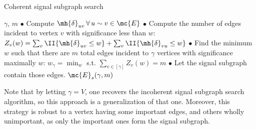 \begin{algorithm}[h!]                      %
\caption{Coherent signal subgraph search}          %
\label{alg:1}                           %
\begin{algorithmic}                    %
\REQUIRE $\gamma$, $m$
\STATE $\bullet$ Compute $\mh{\delta}_{uv} \, \forall \, u \sim v \in \mc{E}$ %
\STATE $\bullet$ Compute the number of edges incident to vertex $v$ with significance less than $w$:  $Z_v(w)=\sum_v \II\{\mh{\delta}_{uv}\leq w\} + \sum_v \II\{\mh{\delta}_{vu} \leq w\}$
\STATE $\bullet$ Find the minimum $w$ such that there are $m$ total edges incident to $\gamma$ vertices with significance maximally $w$: $w_{\gamma}=\min_w$ s.t. $\sum_{v \in [\gamma]} Z_v(w)=m$
\STATE $\bullet$  Let the signal subgraph contain those edges.
\ENSURE $\mc{E}_s(\gamma,m)$
\end{algorithmic}
\end{algorithm}

Note that by letting $\gamma=V$, one recovers the incoherent signal subgraph search algorithm, so this approach is a generalization of that one.  Moreover, this strategy is robust to a vertex having some important edges, and others wholly unimportant, as only the important ones form the signal subgraph.

% 

